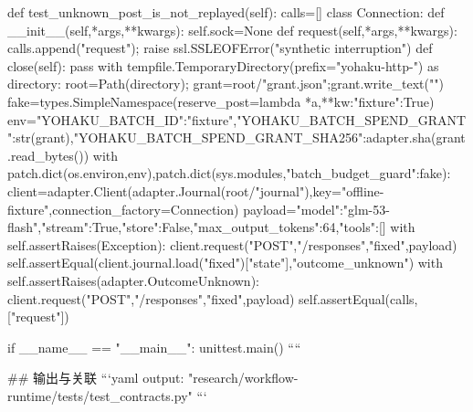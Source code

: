     def test_unknown_post_is_not_replayed(self):
        calls=[]
        class Connection:
            def __init__(self,*args,**kwargs): self.sock=None
            def request(self,*args,**kwargs): calls.append("request"); raise ssl.SSLEOFError("synthetic interruption")
            def close(self): pass
        with tempfile.TemporaryDirectory(prefix="yohaku-http-") as directory:
            root=Path(directory); grant=root/"grant.json";grant.write_text("{}")
            fake=types.SimpleNamespace(reserve_post=lambda *a,**kw:{"fixture":True})
            env={"YOHAKU_BATCH_ID":"fixture","YOHAKU_BATCH_SPEND_GRANT":str(grant),"YOHAKU_BATCH_SPEND_GRANT_SHA256":adapter.sha(grant.read_bytes())}
            with patch.dict(os.environ,env),patch.dict(sys.modules,{"batch_budget_guard":fake}):
                client=adapter.Client(adapter.Journal(root/"journal"),key="offline-fixture",connection_factory=Connection)
                payload={"model":"glm-53-flash","stream":True,"store":False,"max_output_tokens":64,"tools":[]}
                with self.assertRaises(Exception): client.request("POST","/responses","fixed",payload)
                self.assertEqual(client.journal.load("fixed")["state"],"outcome_unknown")
                with self.assertRaises(adapter.OutcomeUnknown): client.request("POST","/responses","fixed",payload)
                self.assertEqual(calls,["request"])

if __name__ == "__main__": unittest.main()
````

## 输出与关联
```yaml
output: "research/workflow-runtime/tests/test_contracts.py"
```
